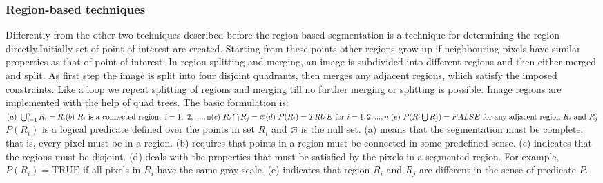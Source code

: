 \subsubsection{Region-based techniques}
Differently from the other two techniques described before the region-based segmentation is a technique for determining the region directly.Initially set of point of interest
are created. Starting from these points other regions grow up if neighbouring pixels have
similar properties as that of point of interest. In region splitting and merging, an image
is subdivided into different regions and then either merged and split. As first step the image is split into four disjoint quadrants, then merges any adjacent regions, which satisfy the imposed constraints. Like a loop we repeat splitting of regions and merging till no further merging or splitting is
possible. Image regions are implemented with the help of quad trees.
The basic formulation is:$\\
(a){\text{ }}\bigcup \nolimits _{{i=1}}^{{n}}{R_{{i}}=R.}\\
(b){\text{ }}R_{{i}}{\text{ is a connected region}},{\text{ i}}={\text{1}},{\text{ 2}},{\text{ }}...,{\text{n}}\\
(c){\text{ }}R_{{i}}\bigcap R_{{j}}=\varnothing\\
(d){\text{ }}P(R_{{i}})=TRUE{\text{ for }}i=1,2,...,n.\\
(e){\text{ }}P(R_{{i}}\bigcup R_{{j}})=FALSE{\text{ for any adjacent region }}R_{{i}}{\text{ and }}R_{{j}}\\
$
$P(R_{{i}})$ is a logical predicate defined over the points in set $R_{i}$ and $\varnothing$  is the null set.
(a) means that the segmentation must be complete; that is, every pixel must be in a region.
(b) requires that points in a region must be connected in some predefined sense.
(c) indicates that the regions must be disjoint.
(d) deals with the properties that must be satisfied by the pixels in a segmented region. For example, $P(R_{{i}})={\text{TRUE}}$ if all pixels in $R_{i}$ have the same gray-scale.
(e) indicates that region $R_{i}$ and $R_{{j}}$ are different in the sense of predicate $P$.\cite{website:region_g}

